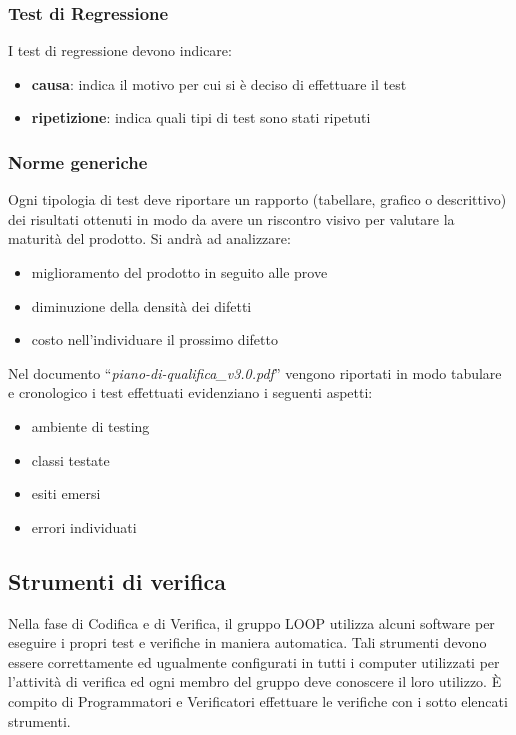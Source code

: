 \documentclass[a4paper,11pt]{article}
\begin{document}
\subsubsection{Test di Regressione}
I test di regressione devono indicare:
\begin{itemize}
\item \textbf{causa}: indica il motivo per cui si \`e deciso di effettuare il test
\item \textbf{ripetizione}: indica quali tipi di test sono stati ripetuti
\end{itemize}

\subsubsection{Norme generiche}
Ogni tipologia di test deve riportare un rapporto (tabellare, grafico o descrittivo) dei risultati ottenuti in modo da avere un riscontro visivo per valutare la maturit\`a del prodotto. Si andr\`a ad analizzare:
\begin{itemize}
\item miglioramento del prodotto in seguito alle prove
\item diminuzione della densit\`a dei difetti
\item costo nell'individuare il prossimo difetto
\end{itemize}
Nel documento ``\textit{piano-di-qualifica\_v3.0.pdf}'' vengono riportati in modo tabulare e cronologico i test effettuati evidenziano i seguenti aspetti:
\begin{itemize}
\item ambiente di testing
\item classi testate
\item esiti emersi
\item errori individuati
\end{itemize}
\newpage
\subsection{Strumenti di verifica}
Nella fase di Codifica e di Verifica, il gruppo LOOP utilizza alcuni software per eseguire i propri test e verifiche in maniera automatica. Tali strumenti devono essere correttamente ed ugualmente configurati in tutti i computer utilizzati per l'attivit\`a di verifica ed ogni membro del gruppo deve conoscere il loro utilizzo. \`E compito di Programmatori e Verificatori effettuare le verifiche con i sotto elencati strumenti.
\end{document}
